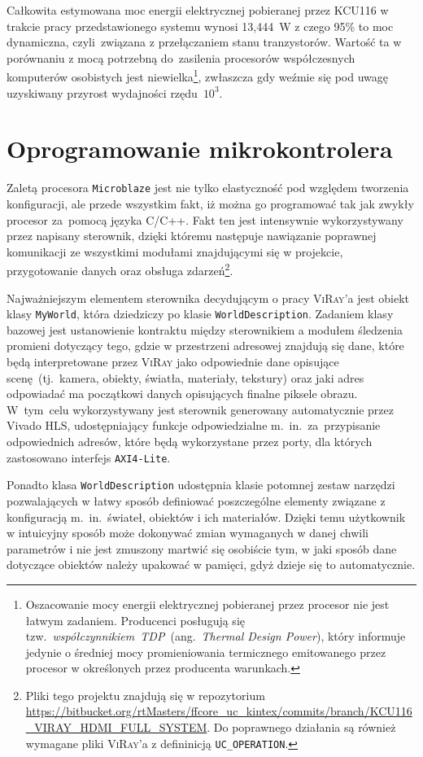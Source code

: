 Całkowita estymowana moc energii elektrycznej pobieranej przez KCU116 w trakcie pracy przedstawionego systemu wynosi 13,444~W z czego 95\% to moc dynamiczna, czyli~związana z przełączaniem stanu tranzystorów. Wartość ta w porównaniu z mocą potrzebną do~zasilenia procesorów współczesnych komputerów osobistych jest niewielka\footnote{Oszacowanie mocy energii elektrycznej pobieranej przez procesor nie jest łatwym zadaniem. Producenci posługują się tzw.~\textit{współczynnikiem~TDP}~(ang.~\textit{Thermal Design Power}), który informuje jedynie o średniej mocy promieniowania termicznego emitowanego przez procesor w określonych przez producenta warunkach.}, zwłaszcza gdy weźmie się pod uwagę uzyskiwany przyrost wydajności rzędu~$10^3$.

\section{Oprogramowanie mikrokontrolera}
Zaletą procesora \texttt{Microblaze} jest nie tylko elastyczność pod względem tworzenia konfiguracji, ale przede wszystkim fakt, iż można go programować tak jak zwykły procesor za~pomocą języka C/C++. Fakt ten jest intensywnie wykorzystywany przez napisany sterownik, dzięki któremu następuje nawiązanie poprawnej komunikacji ze wszystkimi modułami znajdującymi się w projekcie, przygotowanie danych oraz obsługa zdarzeń\footnote{Pliki tego projektu znajdują się w repozytorium \url{https://bitbucket.org/rtMasters/ffcore_uc_kintex/commits/branch/KCU116_VIRAY_HDMI_FULL_SYSTEM}. Do poprawnego działania są również wymagane pliki \textsc{ViRay}'a z defininicją \texttt{UC\_OPERATION}.}.

Najważniejszym elementem sterownika decydującym o pracy \textsc{ViRay}'a jest obiekt klasy \texttt{MyWorld}, która dziedziczy po klasie \texttt{WorldDescription}. Zadaniem klasy bazowej jest ustanowienie kontraktu między sterownikiem a modułem śledzenia promieni dotyczący tego, gdzie w przestrzeni adresowej znajdują się dane, które będą interpretowane przez \textsc{ViRay} jako odpowiednie dane opisujące scenę~(tj.~kamera, obiekty, światła, materiały, tekstury) oraz jaki adres odpowiadać ma początkowi danych opisujących finalne piksele obrazu. W~tym~celu wykorzystywany jest sterownik generowany automatycznie przez Vivado HLS, udostępniający funkcje odpowiedzialne m.~in.~za~przypisanie odpowiednich adresów, które będą wykorzystane przez porty, dla których zastosowano interfejs \texttt{AXI4-Lite}. 

Ponadto klasa \texttt{WorldDescription} udostępnia klasie potomnej zestaw narzędzi pozwalających w łatwy sposób definiować poszczególne elementy związane z konfiguracją m.~in.~świateł, obiektów i ich materiałów. Dzięki temu użytkownik w intuicyjny sposób może dokonywać zmian wymaganych w danej chwili parametrów i nie jest zmuszony martwić się osobiście tym, w jaki sposób dane dotyczące obiektów należy upakować w pamięci, gdyż dzieje się to automatycznie.


